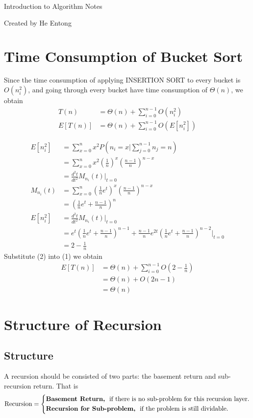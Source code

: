 \documentclass[15pt]{article}
\begin{document}
Introduction to Algorithm Notes \par
\small{Created by He Entong}
\section{Time Consumption of Bucket Sort}
Since the time consumption of applying INSERTION SORT to every bucket is $O(n_i^2)$, and going through every bucket have time consumption of $\Theta(n)$, we obtain
\begin{equation}
\begin{aligned}
    T(n) &= \Theta(n) + \sum_{i=0}^{n-1} O(n_i^2) \\
    E[T(n)] &= \Theta(n) + \sum_{i=0}^{n-1} O(E[n_i^2]) 
\end{aligned}
\end{equation}

\begin{equation}
\begin{aligned}
    E[n_i^2] &= \sum_{x=0}^{n} x^2 P(n_i = x | \sum_{j=0}^{n-1} n_j = n) \\
    & = \sum_{x=0}^{n} x^2 (\frac{1}{n})^x (\frac{n-1}{n})^{n-x} \\ & = \frac{d^2 t}{dt^2} M_{n_i}(t) \bigg|_{t=0} \\
    M_{n_i}(t) &= \sum_{x=0}^{n} (\frac{1}{n} e^{t})^x (\frac{n-1}{n})^{n-x} \\ 
    & = (\frac{1}{n} e^{t} + \frac{n-1}{n})^n \\
    E[n_i^2] &= \frac{d^2 t}{dt^2} M_{n_i}(t) \bigg|_{t=0} \\
    & = e^t (\frac{1}{n} e^t + \frac{n-1}{n})^{n-1} + \frac{n-1}{n} e^{2t} (\frac{1}{n}e^t + \frac{n-1}{n})^{n-2} \bigg|_{t=0} \\ 
    &= 2- \frac{1}{n}
\end{aligned}
\end{equation}
Substitute (2) into (1) we obtain
\begin{equation}
\begin{aligned}
    E[T(n)] &= \Theta(n) + \sum_{i=0}^{n-1} O(2-\frac{1}{n}) \\
    & = \Theta(n) + O(2n-1) \\
    &= \Theta(n)
\end{aligned}
\end{equation}
\section{Structure of Recursion}
\subsection{Structure}
A recursion should be consisted of two parts: the basement return and sub-recursion return. That is
\begin{equation}
\text{Recursion} = \left\{
\begin{aligned}
    & \text{\textbf{Basement Return,}}~~\text{if there is no sub-problem for this recursion layer.} \\
    & \text{\textbf{Recursion for Sub-problem,}}~~\text{if the problem is still dividable.} \notag
\end{aligned}
\right.
\end{equation}
\clearpage
\end{document}
